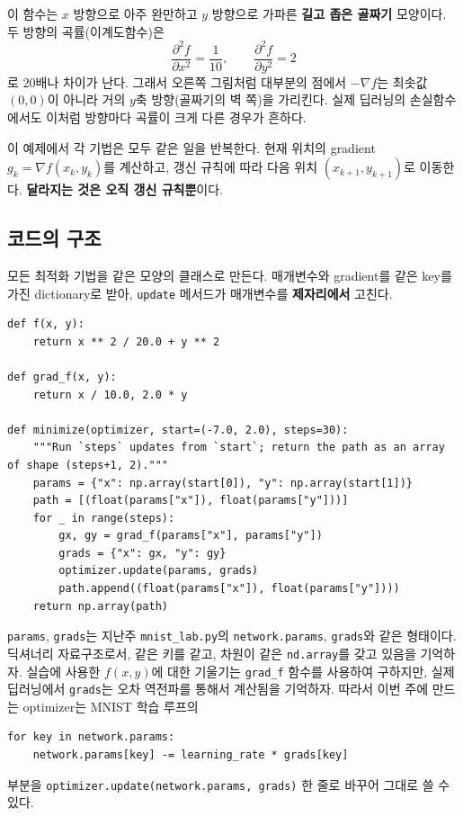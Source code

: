 \documentclass[11pt,a4paper]{article}
\begin{document}
이 함수는 $x$ 방향으로 아주 완만하고 $y$ 방향으로 가파른 \textbf{길고 좁은 골짜기} 모양이다.
두 방향의 곡률(이계도함수)은
\[
\frac{\partial^2 f}{\partial x^2}=\frac{1}{10},
\qquad
\frac{\partial^2 f}{\partial y^2}=2
\]
로 $20$배나 차이가 난다.
그래서 오른쪽 그림처럼 대부분의 점에서 $-\nabla f$는 최솟값 $(0,0)$이 아니라 거의 $y$축 방향(골짜기의 벽 쪽)을 가리킨다.
실제 딥러닝의 손실함수에서도 이처럼 방향마다 곡률이 크게 다른 경우가 흔하다.

이 예제에서 각 기법은 모두 같은 일을 반복한다.
현재 위치의 gradient $g_k=\nabla f(x_k,y_k)$를 계산하고, 갱신 규칙에 따라 다음 위치 $(x_{k+1},y_{k+1})$로 이동한다.
\textbf{달라지는 것은 오직 갱신 규칙뿐}이다.

\subsection{코드의 구조}

모든 최적화 기법을 같은 모양의 클래스로 만든다.
매개변수와 gradient를 같은 key를 가진 dictionary로 받아, \texttt{update} 메서드가 매개변수를 \textbf{제자리에서} 고친다.

\begin{lstlisting}
def f(x, y):
    return x ** 2 / 20.0 + y ** 2

def grad_f(x, y):
    return x / 10.0, 2.0 * y

def minimize(optimizer, start=(-7.0, 2.0), steps=30):
    """Run `steps` updates from `start`; return the path as an array of shape (steps+1, 2)."""
    params = {"x": np.array(start[0]), "y": np.array(start[1])}
    path = [(float(params["x"]), float(params["y"]))]
    for _ in range(steps):
        gx, gy = grad_f(params["x"], params["y"])
        grads = {"x": gx, "y": gy}
        optimizer.update(params, grads)
        path.append((float(params["x"]), float(params["y"])))
    return np.array(path)
\end{lstlisting}

\texttt{params}, \texttt{grads}는 지난주 \texttt{mnist\_lab.py}의 \texttt{network.params}, \texttt{grads}와 같은 형태이다. 딕셔너리 자료구조로서, 같은 키를 같고, 차원이 같은 \texttt{nd.array}를 갖고 있음을 기억하자.
실습에 사용한 $f(x,y)$에 대한 기울기는 \texttt{grad\_f} 함수를 사용하여 구하지만, 실제 딥러닝에서 \texttt{grads}는 오차 역전파를 통해서 계산됨을 기억하자. 따라서 이번 주에 만드는 optimizer는 MNIST 학습 루프의
\begin{lstlisting}
for key in network.params:
    network.params[key] -= learning_rate * grads[key]
\end{lstlisting}
부분을 \texttt{optimizer.update(network.params, grads)} 한 줄로 바꾸어 그대로 쓸 수 있다.
\end{document}
